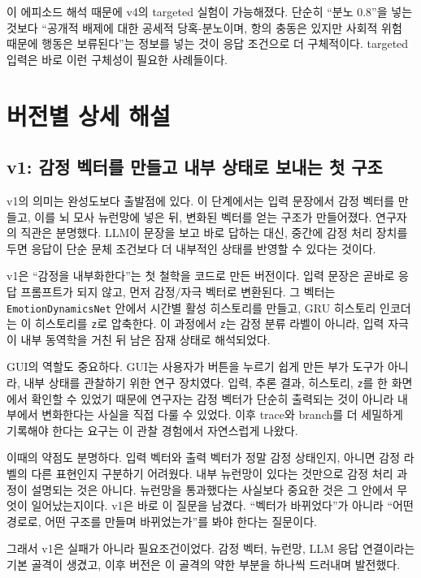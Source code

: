 \documentclass[11pt,a4paper]{article}
\newcommand{\eng}[1]{\texttt{#1}}
\begin{document}
이 에피소드 해석 때문에 v4의 targeted 실험이 가능해졌다. 단순히 ``분노 0.8''을 넣는 것보다 ``공개적 배제에 대한 공세적 당혹-분노이며, 항의 충동은 있지만 사회적 위험 때문에 행동은 보류된다''는 정보를 넣는 것이 응답 조건으로 더 구체적이다. targeted 입력은 바로 이런 구체성이 필요한 사례들이다.

\section{버전별 상세 해설}

\subsection{v1: 감정 벡터를 만들고 내부 상태로 보내는 첫 구조}

v1의 의미는 완성도보다 출발점에 있다. 이 단계에서는 입력 문장에서 감정 벡터를 만들고, 이를 뇌 모사 뉴런망에 넣은 뒤, 변화된 벡터를 얻는 구조가 만들어졌다. 연구자의 직관은 분명했다. LLM이 문장을 보고 바로 답하는 대신, 중간에 감정 처리 장치를 두면 응답이 단순 문체 조건보다 더 내부적인 상태를 반영할 수 있다는 것이다.

v1은 ``감정을 내부화한다''는 첫 철학을 코드로 만든 버전이다. 입력 문장은 곧바로 응답 프롬프트가 되지 않고, 먼저 감정/자극 벡터로 변환된다. 그 벡터는 \eng{EmotionDynamicsNet} 안에서 시간별 활성 히스토리를 만들고, GRU 히스토리 인코더는 이 히스토리를 \eng{z}로 압축한다. 이 과정에서 \eng{z}는 감정 분류 라벨이 아니라, 입력 자극이 내부 동역학을 거친 뒤 남은 잠재 상태로 해석되었다.

GUI의 역할도 중요하다. GUI는 사용자가 버튼을 누르기 쉽게 만든 부가 도구가 아니라, 내부 상태를 관찰하기 위한 연구 장치였다. 입력, 추론 결과, 히스토리, \eng{z}를 한 화면에서 확인할 수 있었기 때문에 연구자는 감정 벡터가 단순히 출력되는 것이 아니라 내부에서 변화한다는 사실을 직접 다룰 수 있었다. 이후 trace와 branch를 더 세밀하게 기록해야 한다는 요구는 이 관찰 경험에서 자연스럽게 나왔다.

이때의 약점도 분명하다. 입력 벡터와 출력 벡터가 정말 감정 상태인지, 아니면 감정 라벨의 다른 표현인지 구분하기 어려웠다. 내부 뉴런망이 있다는 것만으로 감정 처리 과정이 설명되는 것은 아니다. 뉴런망을 통과했다는 사실보다 중요한 것은 그 안에서 무엇이 일어났는지이다. v1은 바로 이 질문을 남겼다. ``벡터가 바뀌었다''가 아니라 ``어떤 경로로, 어떤 구조를 만들며 바뀌었는가''를 봐야 한다는 질문이다.

그래서 v1은 실패가 아니라 필요조건이었다. 감정 벡터, 뉴런망, LLM 응답 연결이라는 기본 골격이 생겼고, 이후 버전은 이 골격의 약한 부분을 하나씩 드러내며 발전했다.
\end{document}
